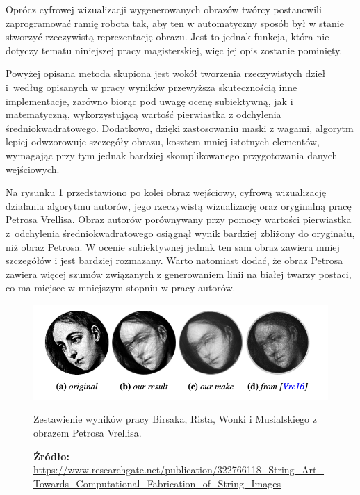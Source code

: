         Oprócz cyfrowej wizualizacji wygenerowanych obrazów twórcy postanowili zaprogramować ramię robota tak, aby ten w automatyczny sposób był w stanie stworzyć rzeczywistą reprezentację obrazu. Jest to jednak funkcja, która nie dotyczy tematu niniejszej pracy magisterskiej, więc jej opis zostanie pominięty. 

        Powyżej opisana metoda skupiona jest wokół tworzenia rzeczywistych dzieł i~według opisanych w pracy wyników przewyższa skutecznością inne implementacje, zarówno biorąc pod uwagę ocenę subiektywną, jak i matematyczną, wykorzystującą wartość pierwiastka z odchylenia średniokwadratowego. Dodatkowo, dzięki zastosowaniu maski z wagami, algorytm lepiej odwzorowuje szczegóły obrazu, kosztem mniej istotnych elementów, wymagając przy tym jednak bardziej skomplikowanego przygotowania danych wejściowych.
        
        Na rysunku \ref{others-birsak-output} przedstawiono po kolei obraz wejściowy, cyfrową wizualizację działania algorytmu autorów, jego rzeczywistą wizualizację oraz oryginalną pracę Petrosa Vrellisa. Obraz autorów porównywany przy pomocy wartości pierwiastka z~odchylenia średniokwadratowego osiągnął wynik bardziej zbliżony do oryginału, niż obraz Petrosa. W ocenie subiektywnej jednak ten sam obraz zawiera mniej szczegółów i jest bardziej rozmazany. Warto natomiast dodać, że obraz Petrosa zawiera więcej szumów związanych z generowaniem linii na białej twarzy postaci, co ma miejsce w mniejszym stopniu w pracy autorów.
        \begin{figure}[htb]
            \centering
            \includegraphics[width=\textwidth,keepaspectratio]{img/3-others/birsak-vs-petros.png}
            \caption{Zestawienie wyników pracy Birsaka, Rista, Wonki i Musialskiego z obrazem Petrosa Vrellisa.}
            \caption*{\footnotesize{\textbf{Źródło:} {\url{https://www.researchgate.net/publication/322766118_String_Art_Towards_Computational_Fabrication_of_String_Images}}}}
            \label{others-birsak-output}
        \end{figure}

